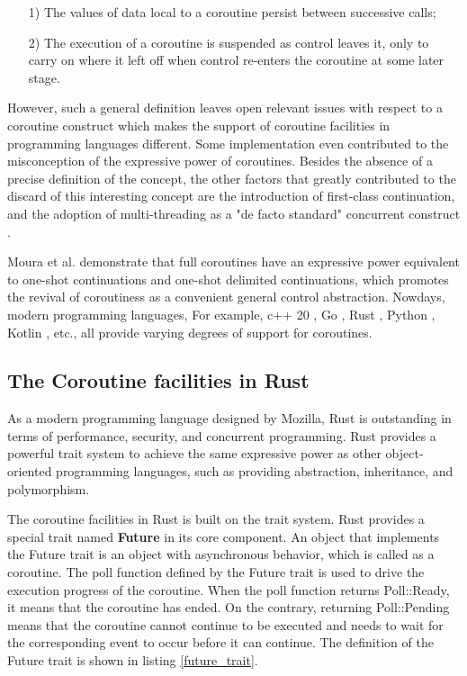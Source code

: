 \documentclass[sigconf,review,anonymous]{acmart}
\begin{document}
\begin{itemize}[leftmargin=*]
    \item[1)] The values of data local to a coroutine persist between successive calls;
    \item[2)] The execution of a coroutine is suspended as control leaves it, only to carry on where it left off when control re-enters the coroutine at some later stage.
\end{itemize}

However, such a general definition leaves open relevant issues with respect to a coroutine construct which makes the support of coroutine facilities in programming languages different. Some implementation even contributed to the misconception of the expressive power of coroutines. Besides the absence of a precise definition of the concept, the other factors that greatly contributed to the discard of this interesting concept are the introduction of first-class continuation, and the adoption of multi-threading as a "de facto standard" concurrent construct \cite{2009Revisiting}.

Moura et al. \cite{2009Revisiting} demonstrate that full coroutines have an expressive power equivalent to one-shot continuations and one-shot delimited continuations, which promotes the revival of coroutiness as a convenient general control abstraction. Nowdays, modern programming languages, For example, c++ 20 \cite{C++20-coroutine}, Go \cite{goroutines}, Rust \cite{rosendahl2017green}, Python \cite{python-coroutine}, Kotlin \cite{kotlin-coroutines}, etc., all provide varying degrees of support for coroutines.

\subsection{The Coroutine facilities in Rust}
\label{subsection: rust_async}

As a modern programming language designed by Mozilla, Rust is outstanding in terms of performance, security, and concurrent programming. Rust provides a powerful trait system to achieve the same expressive power as other object-oriented programming languages, such as providing abstraction, inheritance, and polymorphism. 

The coroutine facilities in Rust is built on the trait system. Rust provides a special trait named \textbf{Future} in its core component. An object that implements the Future trait is an object with asynchronous behavior, which is called as a coroutine. The poll function defined by the Future trait is used to drive the execution progress of the coroutine. When the poll function returns Poll::Ready, it means that the coroutine has ended. On the contrary, returning Poll::Pending means that the coroutine cannot continue to be executed and needs to wait for the corresponding event to occur before it can continue. The definition of the Future trait is shown in listing \ref{future_trait}. 
\end{document}
